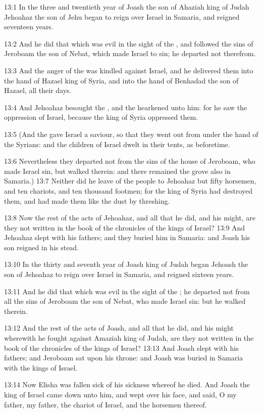 13:1 In the three and twentieth year of Joash the son of Ahaziah king
of Judah Jehoahaz the son of Jehu began to reign over Israel in
Samaria, and reigned seventeen years.

13:2 And he did that which was evil in the sight of the \LORD, and
followed the sins of Jeroboam the son of Nebat, which made Israel to
sin; he departed not therefrom.

13:3 And the anger of the \LORD was kindled against Israel, and he
delivered them into the hand of Hazael king of Syria, and into the
hand of Benhadad the son of Hazael, all their days.

13:4 And Jehoahaz besought the \LORD, and the \LORD hearkened unto him:
for he saw the oppression of Israel, because the king of Syria
oppressed them.

13:5 (And the \LORD gave Israel a saviour, so that they went out from
under the hand of the Syrians: and the children of Israel dwelt in
their tents, as beforetime.

13:6 Nevertheless they departed not from the sins of the house of
Jeroboam, who made Israel sin, but walked therein: and there remained
the grove also in Samaria.)  13:7 Neither did he leave of the people
to Jehoahaz but fifty horsemen, and ten chariots, and ten thousand
footmen; for the king of Syria had destroyed them, and had made them
like the dust by threshing.

13:8 Now the rest of the acts of Jehoahaz, and all that he did, and
his might, are they not written in the book of the chronicles of the
kings of Israel?  13:9 And Jehoahaz slept with his fathers; and they
buried him in Samaria: and Joash his son reigned in his stead.

13:10 In the thirty and seventh year of Joash king of Judah began
Jehoash the son of Jehoahaz to reign over Israel in Samaria, and
reigned sixteen years.

13:11 And he did that which was evil in the sight of the \LORD; he
departed not from all the sins of Jeroboam the son of Nebat, who made
Israel sin: but he walked therein.

13:12 And the rest of the acts of Joash, and all that he did, and his
might wherewith he fought against Amaziah king of Judah, are they not
written in the book of the chronicles of the kings of Israel?  13:13
And Joash slept with his fathers; and Jeroboam sat upon his throne:
and Joash was buried in Samaria with the kings of Israel.

13:14 Now Elisha was fallen sick of his sickness whereof he died. And
Joash the king of Israel came down unto him, and wept over his face,
and said, O my father, my father, the chariot of Israel, and the
horsemen thereof.

